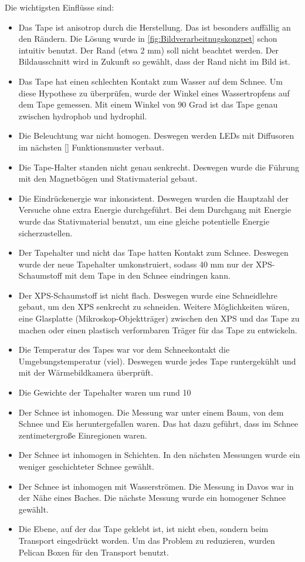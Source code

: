 Die wichtigsten Einflüsse sind:
\begin{itemize}
\item Das Tape ist anisotrop durch die Herstellung. Das ist besonders auffällig an den Rändern. Die Lösung wurde in \ref{fig:Bildverarbeitnugskonzpet} schon intuitiv benutzt. Der Rand (etwa 2 mm) soll nicht beachtet werden. Der Bildausschnitt wird in Zukunft so gewählt, dass der Rand nicht im Bild ist.
\item Das Tape hat einen schlechten Kontakt zum Wasser auf dem Schnee. Um diese Hypothese zu überprüfen, wurde der Winkel eines Wassertropfens auf dem Tape gemessen. Mit einem Winkel von 90 Grad ist das Tape genau zwischen hydrophob und hydrophil.
\item Die Beleuchtung war nicht homogen. Deswegen werden LEDs mit Diffusoren im nächsten \ref{} Funktionsmuster verbaut.
\item Die Tape-Halter standen nicht genau senkrecht. Deswegen wurde die Führung mit den Magnetbögen und Stativmaterial gebaut.
\item Die Eindrückenergie war inkonsistent. Deswegen wurden die Hauptzahl der Versuche ohne extra Energie durchgeführt. Bei dem Durchgang mit Energie wurde das Stativmaterial benutzt, um eine gleiche potentielle Energie sicherzustellen.
\item Der Tapehalter und nicht das Tape hatten Kontakt zum Schnee. Deswegen wurde der neue Tapehalter umkonstruiert, sodass 40 mm nur der XPS-Schaumstoff mit dem Tape in den Schnee eindringen kann.
\item Der XPS-Schaumstoff ist nicht flach. Deswegen wurde eine Schneidlehre gebaut, um den XPS senkrecht zu schneiden. Weitere Möglichkeiten wären, eine Glasplatte (Mikroskop-Objektträger) zwischen den XPS und das Tape zu machen oder einen plastisch verformbaren Träger für das Tape zu entwickeln.
\item Die Temperatur des Tapes war vor dem Schneekontakt die Umgebungstemperatur (viel). Deswegen wurde jedes Tape runtergekühlt und mit der Wärmebildkamera überprüft.
\item Die Gewichte der Tapehalter waren um rund 10 %
\item Der Schnee ist inhomogen. Die Messung war unter einem Baum, von dem Schnee und Eis heruntergefallen waren. Das hat dazu geführt, dass im Schnee zentimetergroße Einregionen waren.
\item Der Schnee ist inhomogen in Schichten. In den nächsten Messungen wurde ein weniger geschichteter Schnee gewählt.
\item Der Schnee ist inhomogen mit Wasserströmen. Die Messung in Davos war in der Nähe eines Baches. Die nächste Messung wurde ein homogener Schnee gewählt.
\item Die Ebene, auf der das Tape geklebt ist, ist nicht eben, sondern beim Transport eingedrückt worden. Um das Problem zu reduzieren, wurden Pelican Boxen für den Transport benutzt.
\end{itemize}

